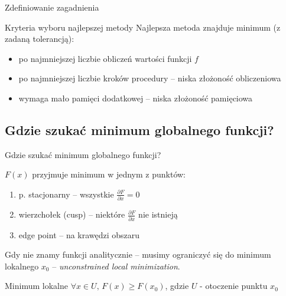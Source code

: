   \begin{frame}{Zdefiniowanie zagadnienia}
    \begin{block}{Kryteria wyboru najlepszej metody}
      Najlepsza metoda znajduje minimum (z zadaną tolerancją):
      \begin{itemize}
        \item po najmniejszej liczbie obliczeń wartości funkcji $ f $
        \item po najmniejszej liczbie kroków procedury -- niska złożoność obliczeniowa
        \item wymaga mało pamięci dodatkowej -- niska złożoność pamięciowa
      \end{itemize}
    \end{block}
  \end{frame}

\subsection{Gdzie szukać minimum globalnego funkcji?}

  \begin{frame}{Gdzie szukać minimum globalnego funkcji?}
    \begin{block}{$ F(x) $ przyjmuje minimum w jednym z punktów:}
      \begin{enumerate}
        \item p. stacjonarny -- wszystkie $ \frac{\partial F}{\partial x} = 0 $
        \item wierzchołek (cusp) -- niektóre $ \frac{\partial F}{\partial x} $ nie istnieją
        \item edge point -- na krawędzi obszaru
      \end{enumerate}
    \end{block}
    Gdy nie znamy funkcji analitycznie -- musimy ograniczyć
    się do minimum lokalnego $ x_0 $ -- \emph{unconstrained local minimization}.
    \begin{block}{Minimum lokalne}
      $\forall x \in U \text{, } F(x) \ge F(x_0)$, gdzie
      $ U $ - otoczenie punktu $ x_0 $
    \end{block}
  \end{frame}

